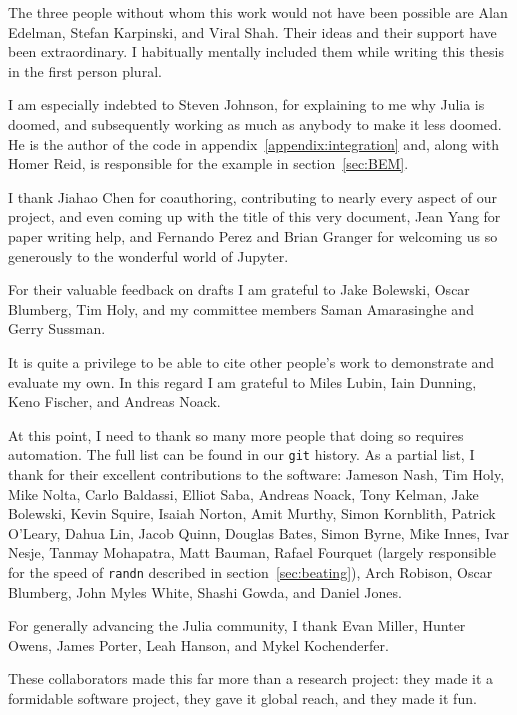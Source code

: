 The three people without whom this work would not have been possible
are Alan Edelman, Stefan Karpinski, and Viral Shah.
Their ideas and their support have been extraordinary.
I habitually mentally included them while writing this thesis in the first
person plural.

I am especially indebted to Steven Johnson, for
explaining to me why Julia is doomed, and subsequently working as much as
anybody to make it less doomed.
He is the author of the code in appendix~\ref{appendix:integration} and,
along with Homer Reid, is responsible for the example in section~\ref{sec:BEM}.

I thank Jiahao Chen for coauthoring, contributing to nearly
every aspect of our project,
and even coming up with the title of this very document,
Jean Yang for paper writing help, and
Fernando Perez and Brian Granger for welcoming us so generously to the wonderful
world of Jupyter.

For their valuable feedback on drafts I am grateful to
Jake Bolewski, Oscar Blumberg, Tim Holy, and my committee members
Saman Amarasinghe and Gerry Sussman.

It is quite a privilege to be able to cite other people's work to
demonstrate and evaluate my own.
In this regard I am grateful to Miles Lubin, Iain Dunning, Keno Fischer,
and Andreas Noack.

At this point, I need to thank so many more people that doing so requires
automation.
The full list can be found in our \texttt{git} history.
As a partial list, I thank for their excellent contributions to the
software:
Jameson Nash,
Tim Holy,
Mike Nolta,
Carlo Baldassi,
Elliot Saba,
Andreas Noack,
Tony Kelman,
Jake Bolewski,
Kevin Squire,
Isaiah Norton,
Amit Murthy,
Simon Kornblith,
Patrick O'Leary,
Dahua Lin,
Jacob Quinn,
Douglas Bates,
Simon Byrne,
Mike Innes,
Ivar Nesje,
Tanmay Mohapatra,
Matt Bauman,
Rafael Fourquet (largely responsible for the speed of \texttt{randn}
described in section~\ref{sec:beating}),
Arch Robison,
Oscar Blumberg,
John Myles White,
Shashi Gowda,
and Daniel Jones.

For generally advancing the Julia community, I thank
Evan Miller, Hunter Owens, James Porter, Leah Hanson, and
Mykel Kochenderfer.

These collaborators made this far more than a research project: they
made it a formidable software project, they gave it global reach, and they
made it fun.
